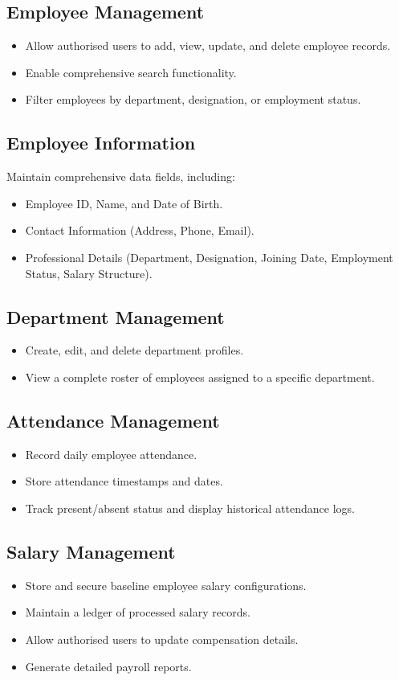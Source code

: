 \documentclass[12pt,a4paper]{report}
\begin{document}
\subsection{Employee Management}
\begin{itemize}
  \item Allow authorised users to add, view, update, and delete employee records.
  \item Enable comprehensive search functionality.
  \item Filter employees by department, designation, or employment status.
\end{itemize}

\subsection{Employee Information}
Maintain comprehensive data fields, including:
\begin{itemize}
  \item Employee ID, Name, and Date of Birth.
  \item Contact Information (Address, Phone, Email).
  \item Professional Details (Department, Designation, Joining Date, Employment Status, Salary Structure).
\end{itemize}

\subsection{Department Management}
\begin{itemize}
  \item Create, edit, and delete department profiles.
  \item View a complete roster of employees assigned to a specific department.
\end{itemize}

\subsection{Attendance Management}
\begin{itemize}
  \item Record daily employee attendance.
  \item Store attendance timestamps and dates.
  \item Track present/absent status and display historical attendance logs.
\end{itemize}

\subsection{Salary Management}
\begin{itemize}
  \item Store and secure baseline employee salary configurations.
  \item Maintain a ledger of processed salary records.
  \item Allow authorised users to update compensation details.
  \item Generate detailed payroll reports.
\end{itemize}
\end{document}
